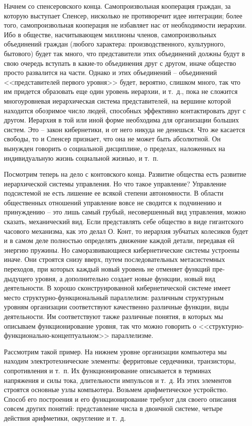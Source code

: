 \documentclass{book}
\begin{document}
Начнем со спенсеровского конца. Самопроизвольная коопе­рация граждан, за которую выступает Спенсер, нисколько не противоречит идее интеграции; более того, самопроизвольная кооперация не избавляет нас от необходимости  иерархии. Ибо в обществе, насчитывающем миллионы членов, самопроизволь­ных объединений граждан (любого характера: производствен­ного, культурного, бытового) будет так много, что предста­вители этих объединений должны будут в свою очередь всту­пать в какие-то объединения друг с другом, иначе общество просто развалится на части. Однако и этих объединений -- объе­динений <<представителей первого уровня>> будет, вероятно, слишком много, так что им придется образовать еще один уро­вень иерархии, и т.~д., пока не сложится многоуровневая иерар­хическая система представителей, на вершине которой находит­ся обозримое число людей, способных эффективно контакти­ровать друг с другом. Иерархия в той или иной форме необ­ходима для организации больших систем. Это -- закон кибер­нетики, и от него никуда не 
денешься. Что же касается свободы, то и Спенсер признает, что она не может быть абсолютной. Он вынужден говорить о социальной дисциплине, о пределах, наложенных на индивидуальную жизнь социальной жизнью, и т.~п.

Посмотрим теперь на дело с контовского конца. Развитие общества есть развитие иерархической системы управления. Но что такое управление? Управление подсистемой не есть лишение ее всякой степени автономности. В области общест­венных отношений управление вовсе не сводится к подчинению и принуждению -- это лишь самый грубый, несовершенный вид управления, можно сказать, механический вид.  Если представ­лять себе общество в виде гигантского часового механизма, как это делал О. Конт, то иерархия зубчатых колесиков будет и в самом деле полностью определять движение каждой детали, передавая ей энергию пружины. Но саморазвивающиеся ки­бернетические системы устроены иначе. Они строятся снизу вверх, путем последовательных метасистемных переходов, при которых каждый новый уровень не отменяет функций пре­дыдущего уровня, а дополнительно создает новые функции, новый вид деятельности. В хорошо сконструированной кибер­нетической системе имеет место структурно-функциональный параллелизм:  различным структурным уровням 
организации соответствуют качественно различные функции, виды деятель­ности. Им соответствуют также различные понятия, в которых мы описываем функционирование уровня, так что можно гово­рить о <<структурно-функционально-концептуальном>> паралле­лизме.

Рассмотрим такой пример. На нижнем уровне организации компьютера мы находим электротехнические элементы: ферритовые сердечники, транзисторы, сопротивления и т.~п. Их функционирование описывается в терминах напряжения и си­лы тока, длительности импульсов и т.~д. Из этих элементов строятся основные узлы компьютера. Возьмем арифметическое устройство. Способ его построения и его функционирова­ние требуют для своего описания совсем других понятий: пред­ставление числа в двоичной системе, четыре действия арифметики, округление и т.~д.
\end{document}
